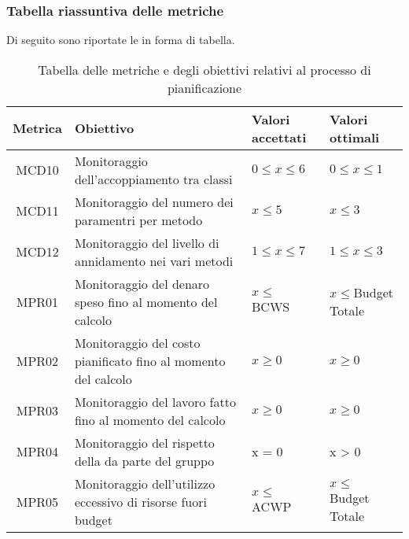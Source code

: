 \subsubsection{Tabella riassuntiva delle metriche}%
Di seguito sono riportate le  in forma di tabella.
\begin{table}[H]
		\begin{center}
			\setlength{\aboverulesep}{0pt}
			\setlength{\belowrulesep}{0pt}
			\setlength{\extrarowheight}{.75ex}
			\begin{tabular}{ c C{6cm} C{3cm} C{3cm} }
				\textbf{Metrica} & \textbf{Obiettivo} & \textbf{Valori accettati} & \textbf{Valori ottimali}  \\
				\toprule
				MCD10 & Monitoraggio dell'accoppiamento tra classi & $ 0 \leq x \leq 6$ & $ 0 \leq x \leq 1$  \\
				MCD11 & Monitoraggio del numero dei paramentri per metodo & $x \leq 5$ & $x \leq 3 $\\ 
				MCD12 & Monitoraggio del livello di annidamento nei vari metodi & $1 \leq x \leq 7 $ & $1 \leq x \leq 3$ \\	
				MPR01 & Monitoraggio del denaro speso fino al momento del calcolo & $ x \leq $ BCWS & $x \leq $Budget Totale  \\
				MPR02 & Monitoraggio del costo pianificato fino al momento del calcolo & $ x \geq 0$ & $x \geq 0$\\
				MPR03 & Monitoraggio del lavoro fatto fino al momento del calcolo & $ x \geq 0 $ & $ x \geq 0 $ \\
				MPR04 & Monitoraggio del rispetto della  da parte del gruppo \gruppo{} & x = 0 & x > 0 \\
				MPR05 & Monitoraggio dell'utilizzo eccessivo di risorse fuori budget & $ x \leq$ ACWP & $ x \leq$ Budget Totale \\
				\bottomrule
			\end{tabular}
			\caption{Tabella delle metriche e degli obiettivi relativi al processo di pianificazione}
		\end{center}
	\end{table}




